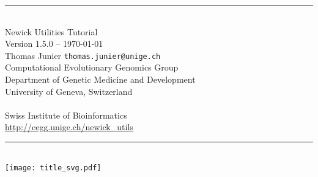 \documentclass[a4paper,10pt]{report}
\newcommand{\Hrule}[1]{\rule{\linewidth}{#1}}
\begin{document}
\nobibliography*

\begin{titlepage}
\begin{center}
\Hrule{0.5mm} \\[0.8cm]
{\Huge Newick Utilities Tutorial} \\[0.5cm]
Version 1.5.0 -- \today \\
\medskip
Thomas Junier \texttt{thomas.junier@unige.ch} \\
Computational Evolutionary Genomics Group \\
Department of Genetic Medicine and Development \\
University of Geneva, Switzerland \\
   \\
Swiss Institute of Bioinformatics \\
\medskip
\url{http://cegg.unige.ch/newick_utils}
\Hrule{0.5mm}
\\[2cm]
\texttt{[image: title\_svg.pdf]}
\end{center}
\end{titlepage}

\tableofcontents











\appendix












% 

% 
\end{document}

